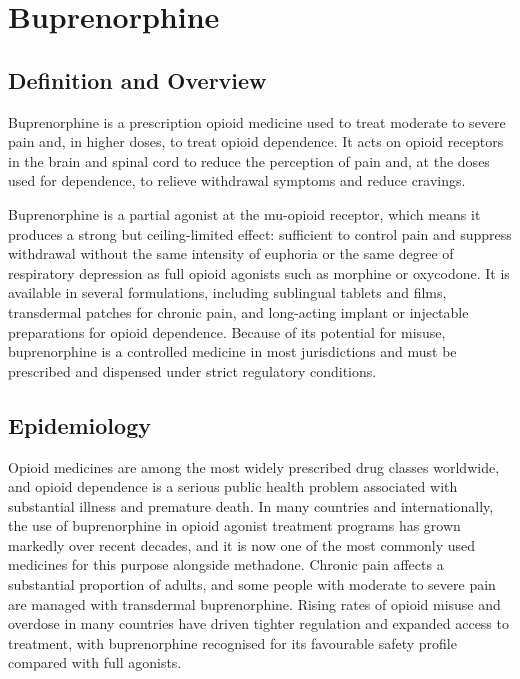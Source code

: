 \chapter{Buprenorphine}

\section*{Definition and Overview}
Buprenorphine is a prescription opioid medicine used to treat moderate to severe pain and, in higher doses, to treat opioid dependence. It acts on opioid receptors in the brain and spinal cord to reduce the perception of pain and, at the doses used for dependence, to relieve withdrawal symptoms and reduce cravings.

Buprenorphine is a partial agonist at the mu-opioid receptor, which means it produces a strong but ceiling-limited effect: sufficient to control pain and suppress withdrawal without the same intensity of euphoria or the same degree of respiratory depression as full opioid agonists such as morphine or oxycodone. It is available in several formulations, including sublingual tablets and films, transdermal patches for chronic pain, and long-acting implant or injectable preparations for opioid dependence. Because of its potential for misuse, buprenorphine is a controlled medicine in most jurisdictions and must be prescribed and dispensed under strict regulatory conditions.

\section*{Epidemiology}
Opioid medicines are among the most widely prescribed drug classes worldwide, and opioid dependence is a serious public health problem associated with substantial illness and premature death. In many countries and internationally, the use of buprenorphine in opioid agonist treatment programs has grown markedly over recent decades, and it is now one of the most commonly used medicines for this purpose alongside methadone. Chronic pain affects a substantial proportion of adults, and some people with moderate to severe pain are managed with transdermal buprenorphine. Rising rates of opioid misuse and overdose in many countries have driven tighter regulation and expanded access to treatment, with buprenorphine recognised for its favourable safety profile compared with full agonists.

